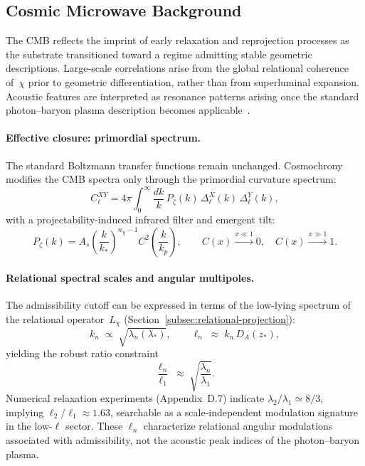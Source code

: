 \subsection{Cosmic Microwave Background}
\label{subsec:cmb}

The CMB reflects the imprint of early relaxation and reprojection
processes as the substrate transitioned toward a regime admitting stable
geometric descriptions.
Large-scale correlations arise from the global relational coherence
of~$\chi$ prior to geometric differentiation, rather than from
superluminal expansion.
Acoustic features are interpreted as resonance patterns arising once the
standard photon--baryon plasma description becomes
applicable~\cite{SachsWolfe1967,HuWhite1997,Planck2020}.

\paragraph{Effective closure: primordial spectrum.}
The standard Boltzmann transfer functions remain unchanged.
Cosmochrony modifies the CMB spectra only through the primordial
curvature spectrum:
\begin{equation}
  C_\ell^{XY}
  = 4\pi \int_0^\infty \frac{dk}{k}\, P_\zeta(k)\,
    \Delta_\ell^{X}(k)\,\Delta_\ell^{Y}(k),
\end{equation}
with a projectability-induced infrared filter and emergent tilt:
\begin{equation}
  P_\zeta(k)
  = A_s\left(\frac{k}{k_*}\right)^{n_\chi-1}
    C^2\!\left(\frac{k}{k_p}\right),
  \qquad
  C(x)\xrightarrow{x\ll 1}0,\quad
  C(x)\xrightarrow{x\gg 1}1.
\end{equation}

\paragraph{Relational spectral scales and angular multipoles.}
The admissibility cutoff can be expressed in terms of the low-lying
spectrum of the relational operator~$L_\chi$
(Section~\ref{subsec:relational-projection}):
\begin{equation}
  k_n \;\propto\; \sqrt{\lambda_n(\lambda_*)},
  \qquad
  \ell_n \;\approx\; k_n\,D_A(z_*),
\end{equation}
yielding the robust ratio constraint
\begin{equation}
  \frac{\ell_n}{\ell_1}
  \;\approx\;
  \sqrt{\frac{\lambda_n}{\lambda_1}}.
  \label{eq:ell_ratio_spectral}
\end{equation}
Numerical relaxation experiments (Appendix~D.7) indicate
$\lambda_2/\lambda_1 \simeq 8/3$, implying
$\ell_2/\ell_1 \approx 1.63$, searchable as a scale-independent
modulation signature in the low-$\ell$ sector.
These $\ell_n$ characterize relational angular modulations associated
with admissibility, not the acoustic peak indices of the photon--baryon
plasma.

